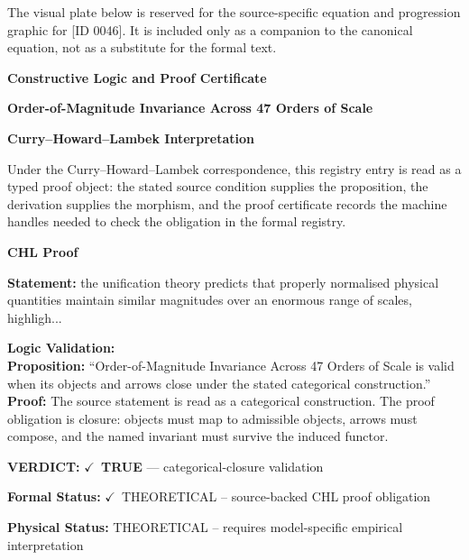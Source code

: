 \begingroup\footnotesize\sloppy
The visual plate below is reserved for the source-specific equation and progression graphic for [ID 0046]. It is included only as a companion to the canonical equation, not as a substitute for the formal text.
\par\endgroup
\ifTZPDarkEdition
{}
\fi

\clearpage
\begingroup\tzpsupportsetup
\noindent\textbf{\fontsize{10.8pt}{12.8pt}\selectfont [ID 0046] Constructive Logic and Proof Certificate}\par
\noindent\textbf{\fontsize{10pt}{12pt}\selectfont Order-of-Magnitude Invariance Across 47 Orders of Scale}\par
\vspace{0.45em}
\begingroup
\footnotesize
\setlength{\parskip}{0.22em}
\setlength{\parindent}{0pt}
\noindent\textbf{Curry--Howard--Lambek Interpretation}\par
Under the Curry--Howard--Lambek correspondence, this registry entry is read as a typed proof
object: the stated source condition supplies the proposition, the derivation supplies the
morphism, and the proof certificate records the machine handles needed to check the obligation
in the formal registry.

\vspace{0.45em}
\noindent\textbf{CHL Proof}\par
\textbf{Statement:} the unification theory predicts that properly normalised physical quantities maintain
similar magnitudes over an enormous range of scales, highligh...

\textbf{Logic Validation:}\\
\textbf{Proposition:} ``Order-of-Magnitude Invariance Across 47 Orders of Scale is valid when its objects and
arrows close under the stated categorical construction.''\\
\textbf{Proof:} The source statement is read as a categorical construction. The proof obligation is
closure: objects must map to admissible objects, arrows must compose, and the named
invariant must survive the induced functor.

\textbf{VERDICT:} \ensuremath{\checkmark}\ \textbf{TRUE} --- categorical-closure validation

\textbf{Formal Status:} \ensuremath{\checkmark}\ THEORETICAL -- source-backed CHL proof obligation

\textbf{Physical Status:} THEORETICAL -- requires model-specific empirical interpretation
\par\vspace{0.45em}
\par
\ifTZPDarkEdition
{}
\fi
\endgroup
\endgroup
